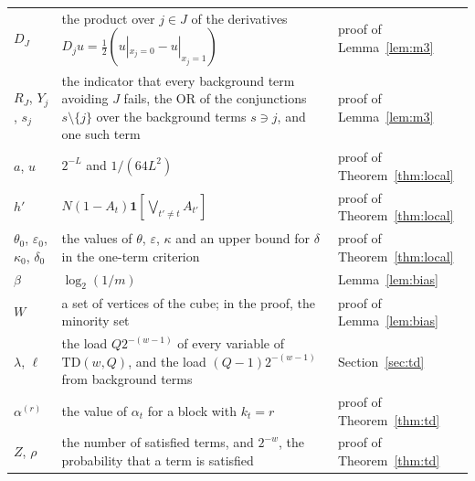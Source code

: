 \documentclass[11pt]{amsart}
\theoremstyle{remark}
\begin{document}
\begin{longtable}{@{}>{\raggedright\arraybackslash}p{}>{\raggedright\arraybackslash}p{}>{\raggedright\arraybackslash}p{}@{}}
$D_J$ & the product over $j\in J$ of the derivatives $D_ju=\tfrac12(u|_{x_j=0}-u|_{x_j=1})$ & proof of Lemma~\ref{lem:m3} \\
$R_J$, $Y_j$, $s_j$ & the indicator that every background term avoiding $J$ fails, the OR of the conjunctions $s\setminus\{j\}$ over the background terms $s\ni j$, and one such term & proof of Lemma~\ref{lem:m3} \\
$a$, $u$ & $2^{-L}$ and $1/(64L^2)$ & proof of Theorem~\ref{thm:local} \\
$h'$ & $N(1-A_t)\mathbf 1[\bigvee_{t'\ne t}A_{t'}]$ & proof of Theorem~\ref{thm:local} \\
$\theta_0$, $\varepsilon_0$, $\kappa_0$, $\delta_0$ & the values of $\theta$, $\varepsilon$, $\kappa$ and an upper bound for $\delta$ in the one-term criterion & proof of Theorem~\ref{thm:local} \\
$\beta$ & $\log_2(1/m)$ & Lemma~\ref{lem:bias} \\
$W$ & a set of vertices of the cube; in the proof, the minority set & proof of Lemma~\ref{lem:bias} \\
$\lambda$, $\ell$ & the load $Q2^{-(w-1)}$ of every variable of $\mathrm{TD}(w,Q)$, and the load $(Q-1)2^{-(w-1)}$ from background terms & Section~\ref{sec:td} \\
$\alpha^{(r)}$ & the value of $\alpha_t$ for a block with $k_t=r$ & proof of Theorem~\ref{thm:td} \\
$Z$, $\rho$ & the number of satisfied terms, and $2^{-w}$, the probability that a term is satisfied & proof of Theorem~\ref{thm:td} \\
\bottomrule
\end{longtable}
\end{document}
